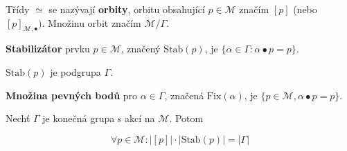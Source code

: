 \begin{definice}
	Třídy $\simeq$ se nazývají \textbf{orbity}, orbitu obsahující $p \in \mathcal{M}$ značím $[p]$ (nebo $[p]_{\mathcal{M},\bullet})$. Množinu orbit značím $\mathcal{M}/\Gamma$.
\end{definice}

\begin{definice}
	\textbf{Stabilizátor} prvku $p \in \mathcal{M}$, značený $\text{Stab}(p)$, je $\{\alpha \in \Gamma: \alpha \bullet p = p\}$.
\end{definice}

\begin{pozor}
	$\text{Stab}(p)$ je podgrupa $\Gamma$.
\end{pozor}

\begin{definice}
	\textbf{Množina pevných bodů} pro $\alpha \in \Gamma$, značená $\text{Fix}(\alpha)$, je $\{p \in \mathcal{M}, \alpha \bullet p = p\}$.
\end{definice}

\begin{lemma}
	Nechť $\Gamma$ je konečná grupa s akcí na $\mathcal{M}$. Potom
	
	$$
	\forall p \in \mathcal{M}: |[p]| \cdot |\text{Stab}(p)| = |\Gamma|
	$$
\end{lemma}

